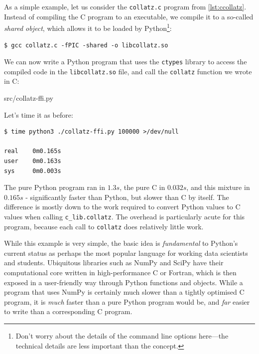 As a simple example, let us consider the \texttt{collatz.c} program
from \cref{lst:ccollatz}.  Instead of compiling the C program to an
executable, we compile it to a so-called \textit{shared object}, which
allows it to be loaded by Python\footnote{Don't worry about the
  details of the command line options here---the technical details are
  less important than the concept.}:

\begin{lstlisting}
$ gcc collatz.c -fPIC -shared -o libcollatz.so
\end{lstlisting}

We can now write a Python program that uses the \texttt{ctypes}
library to access the compiled code in the \texttt{libcollatz.so}
file, and call the \texttt{collatz} function we wrote in C:


{src/collatz-ffi.py}

Let's time it as before:

\begin{lstlisting}
$ time python3 ./collatz-ffi.py 100000 >/dev/null

real    0m0.165s
user    0m0.163s
sys     0m0.003s
\end{lstlisting}

The pure Python program ran in $1.3s$, the pure C in $0.032s$, and
this mixture in $0.165s$ - significantly faster than Python, but
slower than C by itself.  The difference is mostly down to the work
required to convert Python values to C values when calling
\texttt{c\_lib.collatz}.  The overhead is particularly acute for this
program, because each call to \texttt{collatz} does relatively little
work.

While this example is very simple, the basic idea is
\textit{fundamental} to Python's current status as perhaps the most
popular language for working data scientists and students.  Ubiquitous
libraries such as NumPy and SciPy have their computational core
written in high-performance C or Fortran, which is then exposed in a
user-friendly way through Python functions and objects.  While a
program that uses NumPy is certainly much slower than a tightly
optimised C program, it is \textit{much} faster than a pure Python
program would be, and \textit{far} easier to write than a
corresponding C program.

